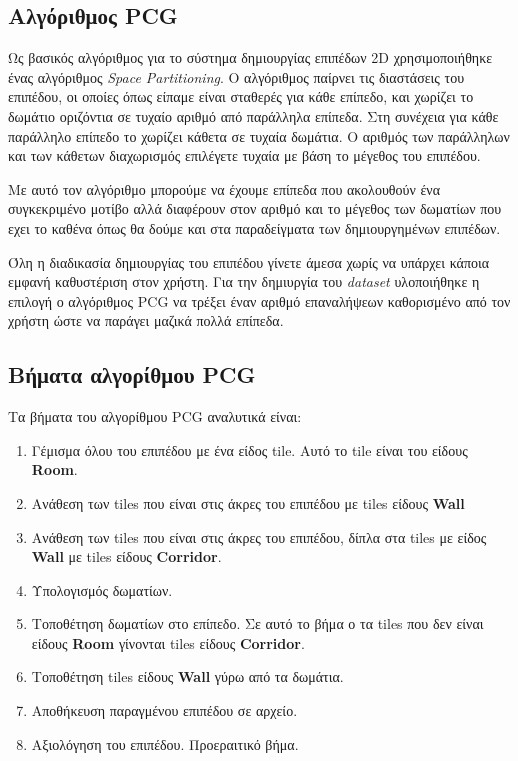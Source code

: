 \subsection{Αλγόριθμος PCG}
Ως βασικός αλγόριθμος για το σύστημα δημιουργίας επιπέδων 2D χρησιμοποιήθηκε ένας αλγόριθμος \textit{Space Partitioning}. O αλγόριθμος παίρνει τις διαστάσεις του επιπέδου, οι οποίες όπως είπαμε είναι σταθερές για κάθε επίπεδο, και χωρίζει το δωμάτιο οριζόντια σε τυχαίο αριθμό από παράλληλα επίπεδα. Στη συνέχεια για κάθε παράλληλο επίπεδο το χωρίζει κάθετα σε τυχαία δωμάτια. Ο αριθμός των παράλληλων και των κάθετων διαχωρισμός επιλέγετε τυχαία με βάση το μέγεθος του επιπέδου.
\par
Με αυτό τον αλγόριθμο μπορούμε να έχουμε επίπεδα που ακολουθούν ένα συγκεκριμένο μοτίβο αλλά διαφέρουν στον αριθμό και το μέγεθος των δωματίων που εχει το καθένα όπως θα δούμε και στα παραδείγματα των δημιουργημένων επιπέδων.
\par
Όλη η διαδικασία δημιουργίας του επιπέδου γίνετε άμεσα χωρίς να υπάρχει κάποια εμφανή καθυστέριση στον χρήστη. Για την δημιυργία του \textit{dataset} υλοποιήθηκε η επιλογή ο αλγόριθμος PCG να τρέξει έναν αριθμό επαναλήψεων καθορισμένο από τον χρήστη ώστε να παράγει μαζικά πολλά επίπεδα.

\subsection{Βήματα αλγορίθμου PCG}
Τα βήματα του αλγορίθμου PCG αναλυτικά είναι:

\begin{enumerate}
	\item Γέμισμα όλου του επιπέδου με ένα είδος tile. Αυτό το tile είναι του είδους \textbf{Room}.
	\item Ανάθεση των tiles που είναι στις άκρες του επιπέδου με tiles είδους \textbf{Wall}
	\item Ανάθεση των tiles που είναι στις άκρες του επιπέδου, δίπλα στα tiles με είδος \textbf{Wall} με tiles είδους \textbf{Corridor}.
	\item Υπολογισμός δωματίων.
	\item Τοποθέτηση δωματίων στο επίπεδο. Σε αυτό το βήμα ο τα tiles που δεν είναι είδους \textbf{Room} γίνονται tiles είδους \textbf{Corridor}.
	\item Τοποθέτηση tiles είδους \textbf{Wall} γύρω από τα δωμάτια.
	\item Αποθήκευση παραγμένου επιπέδου σε αρχείο.
	\item Αξιολόγηση του επιπέδου. Προεραιτικό βήμα.
\end{enumerate}























